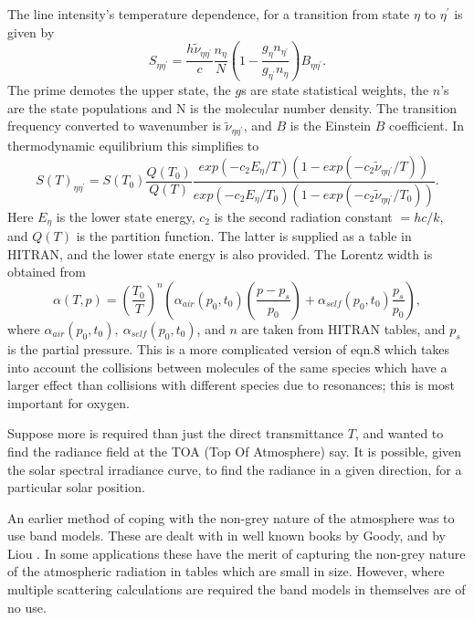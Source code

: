 \documentclass[12pt]{article}
\begin{document}
The line intensity's temperature dependence, for a transition from state $\eta$
to $\eta^\prime$ is given by
\begin{equation}
    S_{\eta \eta^\prime}=\frac{h \tilde{\nu}_{\eta \eta^\prime}}{c}\frac{n_\eta}{N}
\left ( 1-\frac{g_\eta n_{\eta^\prime}}{g_{\eta^\prime} n_\eta} \right ) B_{\eta \eta^\prime}.
\end{equation}
The prime demotes the upper state, the $g$s are state statistical weights, the
$n$'s are the state populations and N is the molecular number density. The
transition frequency converted to wavenumber is $\tilde{\nu}_{\eta \eta^\prime}$, and $B$ is
the Einstein $B$ coefficient. In thermodynamic equilibrium this simplifies to
\begin{equation}
    S(T)_{\eta \eta^\prime}=S(T_0)\frac{Q(T_0)}{Q(T)} 
\frac{exp(-c_2 E_\eta /T) \left (1-exp(-c_2 \tilde{\nu}_{\eta \eta^\prime}/T) \right )}
{exp(-c_2 E_\eta /T_0) \left (1-exp(-c_2\tilde{\nu}_{\eta \eta^\prime}/T_0) \right )}.
\end{equation}
Here $E_\eta$ is the lower state energy, $c_2$ is the second radiation
constant $=h c / k$, and $Q(T)$ is the partition function. The latter
is supplied as a table in HITRAN, and the lower state energy is also provided.
The Lorentz width is obtained from
\begin{equation}
\alpha(T,p)= \left (\frac{T_0}{T} \right )^n \left ( \alpha_{air}(p_0,t_0) 
\left (\frac{p-p_s}{p_0} \right) +\alpha_{self}(p_0,t_0) \frac{p_s}{p_0} \right ),
\end{equation}
where  $\alpha_{air}(p_0,t_0), \> \alpha_{self}(p_0,t_0)$, and $n$ are taken from HITRAN
tables, and $p_s$ is the partial pressure. This is a more complicated version of eqn.8
which takes into account the collisions between molecules of the same species
which have a larger effect than collisions with different species due to
resonances; this is most important for oxygen.


Suppose more is required than just the direct transmittance $T$, and
wanted to find the radiance field at the TOA (Top Of Atmosphere) say.
It is possible, given the solar spectral irradiance curve, to find
the radiance in a given direction, for a particular solar position.


An earlier method of coping with the non-grey nature of the atmosphere was to use band models. These are dealt with in well known books by Goody, and by Liou
 \cite{Liou:Mybib} \cite{GoodyYung:Mybib}. In some applications these have the merit of capturing the non-grey nature of the atmospheric radiation in tables which are small in size. However, where multiple scattering calculations are required the band models in themselves are of no use. 
\end{document}
